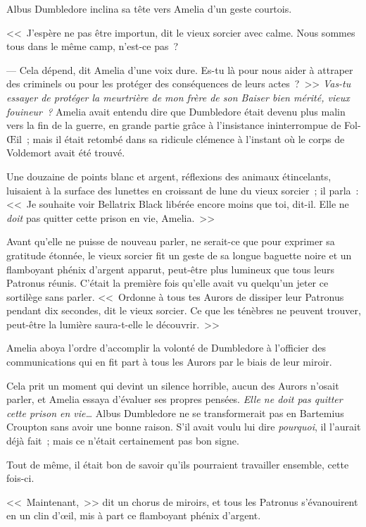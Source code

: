 Albus Dumbledore inclina sa tête vers Amelia d'un geste courtois.

<<~J'espère ne pas être importun, dit le vieux sorcier avec calme. Nous sommes tous dans le même camp, n'est-ce pas~?

--- Cela dépend, dit Amelia d'une voix dure. Es-tu là pour nous aider à attraper des criminels ou pour les protéger des conséquences de leurs actes~?~>> \emph{Vas-tu essayer de protéger la meurtrière de mon frère de son Baiser bien mérité, vieux fouineur~?} Amelia avait entendu dire que Dumbledore était devenu plus malin vers la fin de la guerre, en grande partie grâce à l'insistance ininterrompue de Fol-Œil~; mais il était retombé dans sa ridicule clémence à l'instant où le corps de Voldemort avait été trouvé.

Une douzaine de points blanc et argent, réflexions des animaux étincelants, luisaient à la surface des lunettes en croissant de lune du vieux sorcier~; il parla~: <<~Je souhaite voir Bellatrix Black libérée encore moins que toi, dit-il. Elle ne \emph{doit} pas quitter cette prison en vie, Amelia.~>>

Avant qu'elle ne puisse de nouveau parler, ne serait-ce que pour exprimer sa gratitude étonnée, le vieux sorcier fit un geste de sa longue baguette noire et un flamboyant phénix d'argent apparut, peut-être plus lumineux que tous leurs Patronus réunis. C'était la première fois qu'elle avait vu quelqu'un jeter ce sortilège sans parler. <<~Ordonne à tous tes Aurors de dissiper leur Patronus pendant dix secondes, dit le vieux sorcier. Ce que les ténèbres ne peuvent trouver, peut-être la lumière saura-t-elle le découvrir.~>>

Amelia aboya l'ordre d'accomplir la volonté de Dumbledore à l'officier des communications qui en fit part à tous les Aurors par le biais de leur miroir.

Cela prit un moment qui devint un silence horrible, aucun des Aurors n'osait parler, et Amelia essaya d'évaluer ses propres pensées. \emph{Elle ne doit pas quitter cette prison en vie…} Albus Dumbledore ne se transformerait pas en Bartemius Croupton sans avoir une bonne raison. S'il avait voulu lui dire \emph{pourquoi}, il l'aurait déjà fait~; mais ce n'était certainement pas bon signe.

Tout de même, il était bon de savoir qu'ils pourraient travailler ensemble, cette fois-ci.

<<~Maintenant,~>> dit un chorus de miroirs, et tous les Patronus s'évanouirent en un clin d'œil, mis à part ce flamboyant phénix d'argent.

